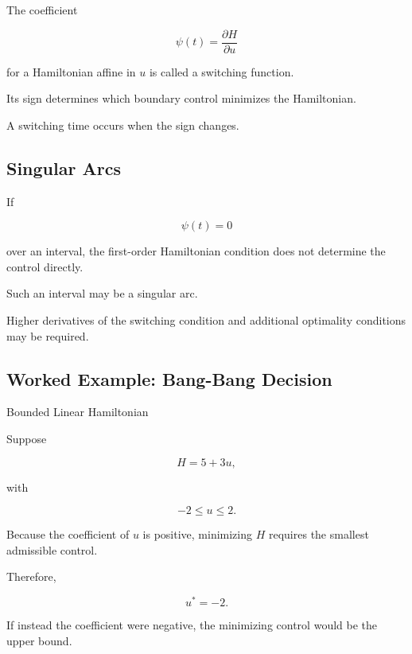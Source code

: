 The coefficient

\[
\boxed{
\psi(t)
=
\frac{\partial H}{\partial u}
}
\]

for a Hamiltonian affine in \(u\) is called a switching function.

Its sign determines which boundary control minimizes the Hamiltonian.

A switching time occurs when the sign changes.

\subsection{Singular Arcs}
\label{subsec:singular-arcs}

If

\[
\boxed{
\psi(t)=0
}
\]

over an interval, the first-order Hamiltonian condition does not determine
the control directly.

Such an interval may be a singular arc.

Higher derivatives of the switching condition and additional optimality
conditions may be required.

\subsection{Worked Example: Bang-Bang Decision}
\label{subsec:worked-bang-bang}

\begin{workedexamplebox}{Bounded Linear Hamiltonian}

Suppose

\[
H
=
5
+
3u,
\]

with

\[
-2
\leq
u
\leq
2.
\]

Because the coefficient of \(u\) is positive, minimizing \(H\) requires
the smallest admissible control.

Therefore,

\begin{answerbox}
\[
\boxed{
u^*=-2.
}
\]
\end{answerbox}

If instead the coefficient were negative, the minimizing control would be
the upper bound.

\end{workedexamplebox}

